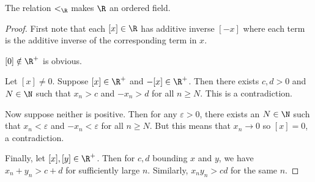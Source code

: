 \begin{proposition*}
    The relation $<_\R$ makes $\R$ an ordered field.
\end{proposition*}
\begin{proof}
    First note that each $[x] \in \R$ has additive inverse $[-x]$ where
    each term is the additive inverse of the corresponding term in $x$.

    $[0] \notin \R^+$ is obvious.

    Let $[x] \ne 0$.
    Suppose $[x] \in \R^+$ and $-[x] \in \R^+$.
    Then there exists $c, d > 0$ and $N \in \N$ such that
    $x_n > c$ and $-x_n > d$ for all $n \ge N$.
    This is a contradiction.

    Now suppose neither is positive.
    Then for any $\varepsilon > 0$, there exists an $N \in \N$ such that
    $x_n < \varepsilon$ and $-x_n < \varepsilon$ for all $n \ge N$.
    But this means that $x_n \to 0$ so $[x] = 0$, a contradiction.

    Finally, let $[x], [y] \in \R^+$.
    Then for $c, d$ bounding $x$ and $y$, we have $x_n + y_n > c + d$ for
    sufficiently large $n$.
    Similarly, $x_n y_n > c d$ for the same $n$.
\end{proof}
